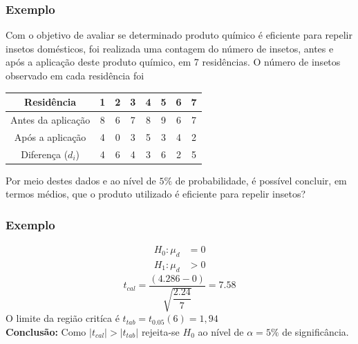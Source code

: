 \documentclass[14pt,aspectratio=1610]{beamer}
\newcommand{\Ho}{\ensuremath{H_{0}}}
\begin{document}
\begin{frame}{}
\frametitle{Exemplo}
\begin{block}{}
\justifying
Com o objetivo de avaliar se determinado produto químico é eficiente para repelir insetos domésticos, foi realizada uma 
contagem do número de insetos, antes e após a aplicação deste produto químico, em 7 residências. O número de insetos 
observado em cada residência foi
\begin{table}[]
\begin{tabular}{c|ccccccc}
             Residência & 1 & 2 & 3 & 4 & 5 & 6 & 7\\ \hline
Antes da aplicação & 8 & 6 & 7 & 8 & 9 & 6 & 7 \\ 
Após a aplicação    & 4 & 0 & 3 & 5 & 3 & 4 & 2 \\ \hline
Diferença ($d_{i}$)      & 4 & 6 & 4 & 3 & 6 & 2 & 5 \\ \hline
\end{tabular}
\end{table}
Por meio destes dados e ao nível de $5\%$ de probabilidade, é possível concluir, em termos médios, que o produto 
utilizado é eficiente para repelir insetos?
\end{block}
\end{frame}

\begin{frame}{}
\frametitle{Exemplo}
\begin{block}{}
\justifying
\begin{align*}
H_{0}: \mu_{d}&=0 \\ 
H_{1}: \mu_{d}&> 0
\end{align*}
$$t_{cal}=\dfrac{(4.286-0)}{\sqrt{\dfrac{2.24}{7}}}=7.58$$
O limite da região critíca é $t_{tab}=t_{0.05}(6)=1,94$\\
\textbf{Conclusão:} Como $|t_{cal}|>|t_{tab}|$ rejeita-se $\Ho$ ao nível de $\alpha=5\%$ de significância.
\end{block}
\end{frame}
\end{document}
